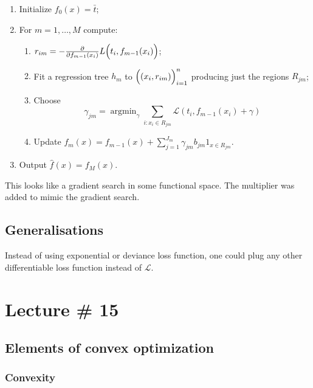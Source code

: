 \documentclass[a4paper]{article}
\newcommand{\Lcal}{\mathcal{L}}
\newcommand{\argmin}{\mathop{\text{argmin}}}
\begin{document}
\begin{enumerate}
	\item Initialize $f_0(x) = \bar{t}$;
	\item For $m=1,\ldots, M$ compute: \begin{enumerate}
		\item $r_{im} = - \frac{\partial}{\partial f_{m-1}(x_i) } L\Bigl(t_i, f_{m-1}(x_i)\Bigr)$;
		\item Fit a regression tree $h_m$ to $\Bigl((x_i, r_{im})\Bigr)_{i=1}^n$ producing just
		the regions $R_{jm}$;
		\item Choose \[
			\gamma_{jm}  = \argmin_{\gamma} \sum_{i: x_i\in R_{jm}} \Lcal( t_i, f_{m-1}(x_i) + \gamma )\]
		\item Update $f_m(x) = f_{m-1}(x) + \sum_{j=1}^{J_m} \gamma_{jm} b_{jm} 1_{x\in R_{jm}} $.
	\end{enumerate}
	\item Output $\hat{f}(x) = f_M(x)$.
\end{enumerate}
This looks like a gradient search in some functional space. The multiplier was added to
mimic the gradient search.


\subsection{Generalisations} %
\label{sub:generalisations}

Instead of using exponential or deviance loss function, one could plug any other
differentiable loss function instead of $\Lcal$. 



\section{Lecture \# 15} %
\label{sec:lecture_15}

\subsection{Elements of convex optimization} %
\label{sub:elements_of_convex_optimization}

\subsubsection{Convexity} %
\label{ssub:convexity}
\end{document}
